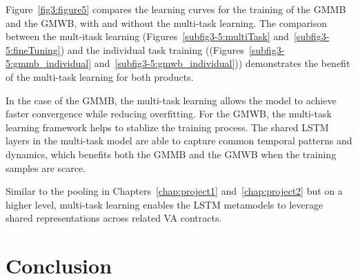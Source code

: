 Figure~\ref{fig3:figure5} compares the learning curves for the training of the GMMB and the GMWB, with and without the multi-task learning.
The comparison between the mult-itask learning (Figures~\ref{subfig3-5:multiTask} and~\ref{subfig3-5:fineTuning}) and the individual task training ((Figures~\ref{subfig3-5:gmmb_individual} and~\ref{subfig3-5:gmwb_individual})) demonstrates the benefit of the multi-task learning for both products. 

In the case of the GMMB, the multi-task learning allows the model to achieve faster convergence while reducing overfitting.
For the GMWB, the multi-task learning framework helps to stablize the training process.
The shared LSTM layers in the multi-task model are able to capture common temporal patterns and dynamics, which benefits both the GMMB and the GMWB when the training samples are scarce.

Similar to the pooling in Chapters~\ref{chap:project1} and~\ref{chap:project2} but on a higher level, multi-task learning enables the LSTM metamodels to leverage shared representations across related VA contracts.



\section{Conclusion} \label{sec3:conclusion}


